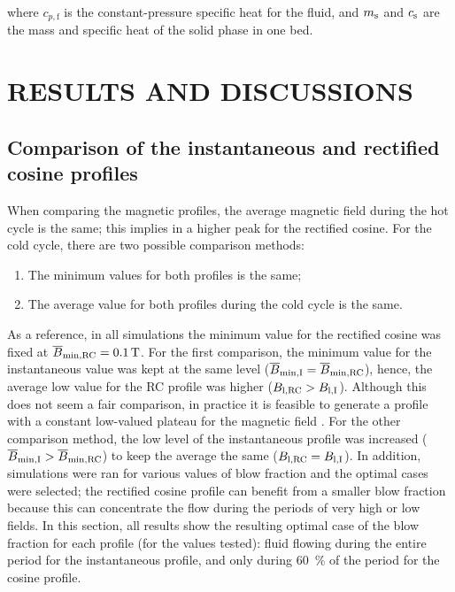 \documentclass[draft]{svjour3}
\begin{document}
\noindent where $c_{p,\mathrm{f}}$ is the constant-pressure specific heat for the fluid, and $m_{\mathrm{s}}$ and $c_{\mathrm{s}}$ are the mass and specific heat of the solid phase in one bed. 

\section{RESULTS AND DISCUSSIONS}
\label{sec:results-discussions}

\subsection{Comparison of the instantaneous and rectified cosine profiles}
\label{sec:comp-inst-cosine}

When comparing the magnetic profiles, the average magnetic field during the hot cycle is the same; this implies in a higher peak for the rectified cosine. For the cold cycle, there are two possible comparison methods:

\begin{enumerate}
\item The minimum values for both profiles is the same;
\item The average value for both profiles during the cold cycle is the same.
\end{enumerate}

As a reference, in all simulations  the minimum value for the rectified cosine was fixed at $\overline{B}_{\mathrm{min,RC}} = \SI{0.1}{\tesla}$. For the first comparison, the minimum value for the instantaneous value was kept at the same level ($\overline{B}_{\mathrm{min,I}} =  \overline{B}_{\mathrm{min,RC}}$), hence, the average low value for the RC profile was higher ($B_{\mathrm{l,RC}} > B_{\mathrm{l,I}}$). Although this does not seem a fair comparison, in practice it is feasible to generate a profile with a constant low-valued plateau for the magnetic field \cite{bib:insinga16_optim,bib:benedict16_desig}. For the other comparison method, the low level of the instantaneous profile was increased ($\overline{B}_{\mathrm{min,I}} >  \overline{B}_{\mathrm{min,RC}}$) to keep the average the same ($B_{\mathrm{l,RC}} = B_{\mathrm{l,I}}$). In addition, simulations were ran for various values of blow fraction and the optimal cases were selected; the rectified cosine profile can benefit from a smaller blow fraction because this can concentrate the flow during the periods of very high or low fields. In this section, all results show the resulting optimal case of the blow fraction for each profile (for the values tested): fluid flowing during the entire period for the instantaneous profile, and only during \SI{60}{\percent} of the period for the cosine profile.
\end{document}

